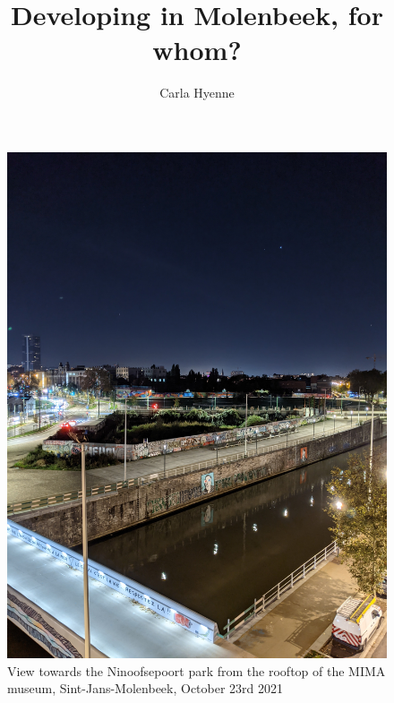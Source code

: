 \documentclass{article}
\title{Developing in Molenbeek, for whom?}
\author{Carla Hyenne}
\begin{document}
\maketitle

\begin{figure}[h!]
	\centering
	\captionsetup{labelformat=empty}
	\includegraphics[width=\textwidth, angle=-90]{bxl_canal_far}
	\caption{View towards the Ninoofsepoort park from the rooftop of the MIMA museum, Sint-Jans-Molenbeek, October 23rd 2021}
\end{figure}

\pagebreak
\end{document}
